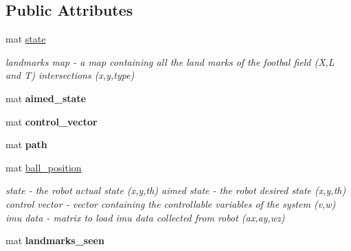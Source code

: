 \subsection*{Public Attributes}
\begin{DoxyCompactItemize}
\item 
\mbox{\label{class_robot_navigation_a93eb7dd2877e1f72f5741fb396adea81}} 
mat \hyperlink{class_robot_navigation_a93eb7dd2877e1f72f5741fb396adea81}{state}
\begin{DoxyCompactList}\small\item\em landmarks map -\/ a map containing all the land marks of the footbal field (X,L and T) intersections (x,y,type) \end{DoxyCompactList}\item 
\mbox{\label{class_robot_navigation_aaa625625a2ba01d1602891ea19691462}} 
mat {\bfseries aimed\+\_\+state}
\item 
\mbox{\label{class_robot_navigation_a73838ceedac8376f3c333fcbfcd4a364}} 
mat {\bfseries control\+\_\+vector}
\item 
\mbox{\label{class_robot_navigation_ac427c1bf3d5df9b984f9dfe4241d1454}} 
mat {\bfseries path}
\item 
\mbox{\label{class_robot_navigation_a1e4f1a5b3c01ba9be911c006b478f371}} 
mat \hyperlink{class_robot_navigation_a1e4f1a5b3c01ba9be911c006b478f371}{ball\+\_\+position}
\begin{DoxyCompactList}\small\item\em state -\/ the robot actual state (x,y,th) aimed state -\/ the robot desired state (x,y,th) control vector -\/ vector containing the controllable variables of the system (v,w) imu data -\/ matrix to load imu data collected from robot (ax,ay,wz) \end{DoxyCompactList}\item 
\mbox{\label{class_robot_navigation_ab40654dfb4a3593172da4b285734cdf5}} 
mat {\bfseries landmarks\+\_\+seen}
\item 
\mbox{\label{class_robot_navigation_a75aaeeea363d928d6dc8c6de90824d3f}} 

\end{DoxyCompactItemize}
